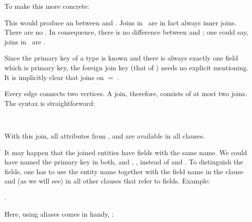    

To make this more concrete:

  
   

This would produce an  
between  and .
Joins in \nowdb\ are in fact always inner joins.
There are no . 
In consequence, there is no difference between
 and ; one could say,
joins in \nowdb\ are .

Since the primary key of a type is known
and there is always exactly one field
which is primary key, the foreign join key
(that of ) needs no
explicit mentioning. It is implicitly clear 
that   
joins on  $=$ .

Every edge connects two vertices.
A join, therefore, consists of at most two joins.
The syntax is straightforward:

 
    \\
\hspace*{2cm}   

With this join, all attributes
from ,  and 
are available in all clauses.

It may happen that the joined entities
have fields with the same name.
We could have named the primary key in both,
 and ,
, instead of
 and .
To distinguish the fields,
one has to use the entity name together with the field name
in the  clause and (as we will see) in all
other clauses that refer to fields.
Example:

 .

Here, using aliases comes in handy, \eg:

   
    
                 \\
\hspace*{2.8cm}   
                               

